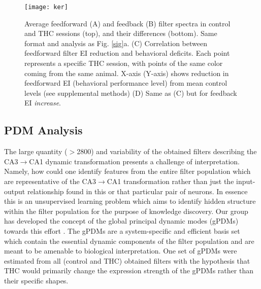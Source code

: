 \documentclass[11pt,a4paper,final]{article}
\begin{document}
\begin{figure}[!ht]
\centering
\texttt{[image: ker]}
\caption[Kernel Population Metrics]{
Average feedforward (A) and feedback (B) filter spectra in control and THC sessions (top), and their differences (bottom). Same format and analysis as Fig. \ref{sig}a.
(C) Correlation between feedforward filter EI reduction and behavioral deficits. Each point represents a specific THC session, with points of the same color coming from the same animal. X-axis (Y-axis) shows reduction in feedforward EI (behavioral performance level) from mean control levels (see supplemental methods)
(D) Same as (C) but for feedback EI \textit{increase}.}
\label{ker}
\end{figure}

    \subsection{PDM Analysis}

The large quantity ($>$2800) and variability of the obtained filters describing the CA3$\to$CA1 dynamic transformation presents a challenge of interpretation.
Namely, how could one identify features from the entire filter population which are representative of the CA3$\to$CA1 transformation rather than just the input-output relationship found in this or that particular pair of neurons.
In essence this is an unsupervised learning problem which aims to identify hidden structure within the filter population for the purpose of knowledge discovery.
Our group has developed the concept of the global principal dynamic modes (gPDMs) towards this effort \citep{marm04,marm13,sandler15stc}.
The gPDMs are a system-specific and efficient basis set which contain the essential dynamic components of the filter population and are meant to be amenable to biological interpretation.
One set of gPDMs were estimated from all (control and THC) obtained filters with the hypothesis that THC would primarily change the expression strength of the gPDMs rather than their specific shapes.
\end{document}
